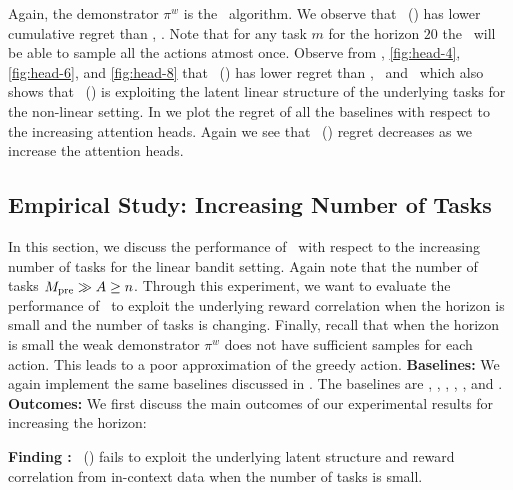 \documentclass[10pt]{article}
\theoremstyle{plain}
\theoremstyle{definition}
\theoremstyle{remark}
\newcounter{findingcounter}
\newcommand{\customfinding}[1][\normalfont]{\stepcounter{findingcounter}\textbf{Finding \thefindingcounter:}#1 }
\begin{document}
Again, the demonstrator $\pi^w$ is the \ts\ algorithm. We observe that \pred\ (\gt) has lower cumulative regret than \dptg, \ad. Note that for any task $m$ for the horizon $20$ the \ts\ will be able to sample all the actions atmost once.
Observe from , \ref{fig:head-4}, \ref{fig:head-6}, and \ref{fig:head-8} that \pred\ (\gt) has lower regret than \ad, \ts\ and \linucb\ which also shows that \pred\ (\gt) is exploiting the latent linear structure of the underlying tasks for the non-linear setting.
In  we plot the regret of all the baselines with respect to the increasing attention heads. Again we see that \pred\ (\gt) regret decreases as we increase the attention heads.
\subsection{Empirical Study: Increasing Number of Tasks}
\label{sec:envs}
In this section, we discuss the performance of \pred\ with respect to the increasing number of tasks for the linear bandit setting. Again note that the number of tasks $M_{\text{pre}} \gg A \geq n$.
Through this experiment, we want to evaluate the performance of \pred\ to exploit the underlying reward correlation when the horizon is small and the number of tasks is changing.
Finally, recall that when the horizon is small the weak demonstrator $\pi^w$ does not have sufficient samples for each action. This leads to a poor approximation of the greedy action.
\textbf{Baselines:} We again implement the same baselines discussed in . The baselines are \pred, \predt, \dptg, \ad, \ts, and \linucb.
\textbf{Outcomes:} We first discuss the main outcomes of our experimental results for increasing the horizon:
\begin{tcolorbox}
\customfinding \pred\ (\gt) fails to exploit the underlying latent structure and reward correlation from in-context data when the number of tasks is small.
\end{tcolorbox}
\end{document}
